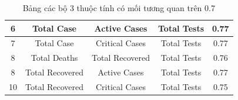 \documentclass[a4paper, 12pt]{article}
\begin{document}
\begin{itemize}
\begin{table}[H]
\begin{tabular}{|c|c|c|c|c|}
            6              & Total Case                & Active Cases              & Total Tests                 & 0.77                \\ \hline
            7              & Total Case                & Critical Cases            & Total Tests                 & 0.77                \\ \hline
            8              & Total Deaths              & Total Recovered           & Total Tests                 & 0.76                \\ \hline
            8              & Total Recovered           & Active Cases              & Total Tests                 & 0.77                \\ \hline
            10             & Total Recovered           & Critical Cases            & Total Tests                 & 0.75                \\ \hline
            \end{tabular}
            \caption{Bảng các bộ 3 thuộc tính có mối tương quan trên 0.7}
        \end{table}


\end{itemize}
\end{document}
